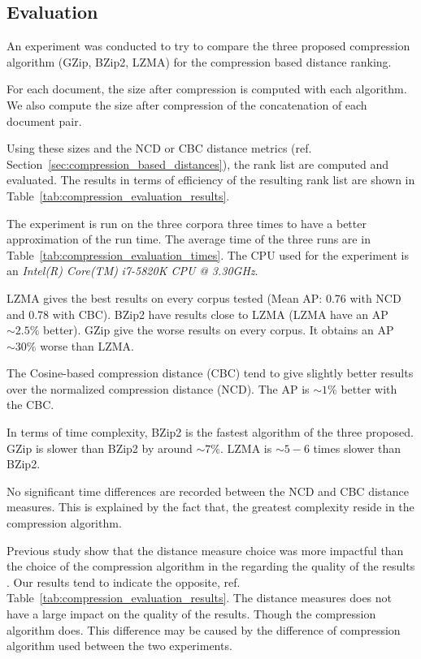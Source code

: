 \subsection{Evaluation}

An experiment was conducted to try to compare the three proposed compression algorithm (GZip, BZip2, LZMA) for the compression based distance ranking.

For each document, the size after compression is computed with each algorithm.
We also compute the size after compression of the concatenation of each document pair.

Using these sizes and the NCD or CBC distance metrics (ref. Section~\ref{sec:compression_based_distances}), the rank list are computed and evaluated.
The results in terms of efficiency of the resulting rank list are shown in Table~\ref{tab:compression_evaluation_results}.

The experiment is run on the three corpora three times to have a better approximation of the run time.
The average time of the three runs are in Table~\ref{tab:compression_evaluation_times}.
The CPU used for the experiment is an \textit{Intel(R) Core(TM)} \textit{i7-5820K CPU} \textit{@ 3.30GHz}.

LZMA gives the best results on every corpus tested (Mean AP: 0.76 with NCD and 0.78 with CBC).
BZip2 have results close to LZMA (LZMA have an AP $\sim 2.5\%$ better).
GZip give the worse results on every corpus.
It obtains an AP $\sim 30\%$ worse than LZMA.

The Cosine-based compression distance (CBC) tend to give slightly better results over the normalized compression distance (NCD).
The AP is $\sim 1\%$ better with the CBC.

In terms of time complexity, BZip2 is the fastest algorithm of the three proposed.
GZip is slower than BZip2 by around $\sim 7\%$.
LZMA is $\sim 5-6$ times slower than BZip2.

No significant time differences are recorded between the NCD and CBC distance measures.
This is explained by the fact that, the greatest complexity reside in the compression algorithm.

Previous study show that the distance measure choice was more impactful than the choice of the compression algorithm in the regarding the quality of the results \cite{comparing_compression}.
Our results tend to indicate the opposite, ref. Table~\ref{tab:compression_evaluation_results}.
The distance measures does not have a large impact on the quality of the results.
Though the compression algorithm does.
This difference may be caused by the difference of compression algorithm used between the two experiments.


